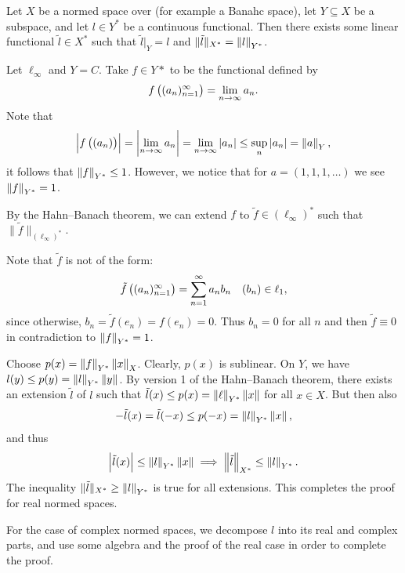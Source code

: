 \documentclass[11pt,a4paper]{article}
\begin{document}
\begin{theorem}
  \label{thm:hahn-banach-ver-two}
  Let $X$ be a normed space over (for example a Banahc space),
  let $Y \subseteq X$ be a subspace,
  and let $l \in Y^*$ be a continuous functional.
  Then there exists some linear functional
  $\tilde l \in X^*$ such that $\tilde l \vert_{Y} = l$
  and $\|\tilde l\|_{X^*} = \left\lVert l\right\rVert_{Y^*}$.
\end{theorem}

\begin{example}
  Let $\ell_{\infty}$ and $Y = C$.
  Take $f \in Y*$ to be the functional defined by
  \[
    f\del{(a_n)_{n=1}^{\infty}} = \lim_{n \to \infty} a_n.
  \]
  Note that
  \begin{align*}
    \abs{f\del{(a_n)}} =
    \abs{\lim_{n \to \infty} a_n} =
    \lim_{n \to \infty} |a_n| \le \sup_{n} \abs{a_n} = \norm{a}_Y,
  \end{align*}
  it follows that $\left\lVert f\right\rVert_{Y^*} \le 1$.
  However, we notice that for $a = (1,1,1,\dots)$ we see
  $\left\lVert f\right\rVert_{Y^*} = 1$.

  By the Hahn--Banach theorem,
  we can extend $f$ to $\tilde f \in (\ell_{\infty})^*$
  such that $\|\tilde f\|_{(\ell_{\infty})^*}$.

  Note that $\tilde f$ is not of the form:
  \[
    \tilde f \del{(a_n)_{n=1}^{\infty}} =
    \sum_{n=1}^{\infty} a_n b_n \quad (b_n) \in \ell_1,
  \]
  since otherwise, $b_n = \tilde f(e_n) = f(e_n) = 0$.
  Thus $b_n = 0$ for all $n$ and then $\tilde f \equiv 0$ in contradiction
  to $\left\lVert f\right\rVert_{Y^*} = 1$.
\end{example}

\begin{proofof}{}
  Choose $p(x) = \left\lVert f\right\rVert_{Y^*} \left\lVert x\right\rVert_X$.
  Clearly, $p(x)$ is sublinear.
  On $Y$, we have $l(y) \le p(y) = \left\lVert l\right\rVert_{Y^*} \left\lVert y\right\rVert$.
  By version 1 of the Hahn--Banach theorem,
  there exists an extension $\tilde l$
  of $l$ such that $\tilde l(x) \le p(x) = \left\lVert\ell\right\rVert_{Y^*} \left\lVert x\right\rVert$
  for all $x \in X$.
  But then also
  \[
    -\tilde l(x) = \tilde l(-x) \le p(-x) = \left\lVert l\right\rVert_{Y^*} \left\lVert x\right\rVert,
  \]
  and thus
  \[
    \left\lvert\tilde l(x)\right\rvert \le
    \left\lVert l\right\rVert_{Y^*} \left\lVert x\right\rVert \implies
    \left\lVert\tilde l\right\rVert_{X^*} \le \left\lVert l\right\rVert_{Y^*}.
  \]
  The inequality $\|\tilde l\|_{X^*} \geq \left\lVert l\right\rVert_{Y^*}$ is true for all
  extensions.
  This completes the proof for real normed spaces.

  For the case of complex normed spaces, we decompose $l$ into its
  real and complex parts, and use some algebra and the proof of the real
  case in order to complete the proof.
\end{proofof}
\end{document}
